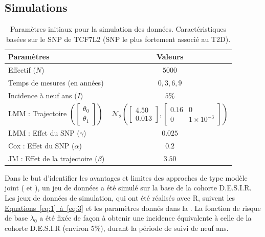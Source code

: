 \documentclass[11pt, a4paper]{article}
\begin{document}
\subsection{Simulations}
\begin{table}[h]
    \begin{center}
        \begin{tabular}{lc}
            \hline
            Paramètres & Valeurs\\
            \hline
            Effectif ($N$) & $5000$\\
            Temps de mesures (en années) & $0, 3, 6, 9$\\
            Incidence à neuf ans ($I$) & $5\%$\\
            LMM : Trajectoire $\left (\begin{bmatrix}\theta_{0}\\\theta_{1}\end{bmatrix}\right )$ & $\mathcal{N}_2\left (\begin{bmatrix}4.50\\0.013\end{bmatrix} , \begin{bmatrix} 0.16 & 0 \\ 0 & 1\times 10^{-3} \end{bmatrix} \right )$\\
            LMM : Effet du SNP ($\gamma$) & $0.025$\\
            Cox : Effet du SNP ($\alpha$) & $0.2$\\
            JM : Effet de la trajectoire ($\beta$) & $3.50$\\
            \hline
        \end{tabular}
    \end{center}
    \vspace{-15pt}
    \caption{Paramètres initiaux pour la simulation des données. {\small Caractéristiques basées sur le SNP de TCF7L2 (SNP le plus fortement associé au T2D).}}
    \label{tab:simpar}
\end{table}
\par{Dans le but d’identifier les avantages et limites des approches de type modèle joint ( et ),
un jeu de données a été simulé sur la base de la cohorte D.E.S.I.R.
Les jeux de données de simulation, qui ont été réalisés avec R, suivent les \hyperref[eq:1]{Equations~\ref*{eq:1}~à~\ref{eq:3}}
et les paramètres donnés dans la .
La fonction de risque de base $\lambda_0$ a été fixée de façon à obtenir une incidence équivalente à celle de
la cohorte D.E.S.I.R (environ 5\%), durant la période de suivi de neuf ans.}
\end{document}
